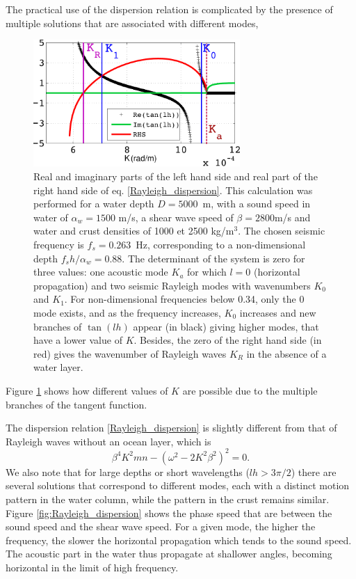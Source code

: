 The practical use of the dispersion relation is complicated by the presence of multiple solutions that are associated with different modes, 
\begin{figure}[ht]
\centerline{\includegraphics[width=0.7\textwidth]{FIGS_CH_SISMO/finding_roots_and_acoustic.pdf}}
  \caption{Real and imaginary parts of the left hand side 
  and real part of the right hand side of eq. \ref{Rayleigh_dispersion}. 
This calculation was performed for a water depth $D=5000$~m, with a sound speed in water of  $\alpha_w=1500$ m/s, a shear wave speed of  
$\beta=2800$m/s and water and crust densities of  1000 et 2500 kg/m$^3$. The chosen seismic frequency is $f_s=0.263$~Hz, 
corresponding to a non-dimensional depth $f_s h/\alpha_w=0.88$. 
The determinant of the system is zero for three values: one acoustic mode $K_a$ for which $l=0$ (horizontal propagation) and 
two seismic Rayleigh modes with wavenumbers $K_0$ and $K_1$. For non-dimensional frequencies below 0.34, only the 0 mode exists, 
and as the frequency increases, $K_0$ increases and new branches of  $\tan(lh)$ appear (in black) giving higher modes, that have a lower value 
of $K$. Besides, the zero of the right hand side (in red) gives the wavenumber of Rayleigh waves $K_R$ in the absence of a water layer.}
\label{fig:Rayleigh_roots}
\end{figure}

Figure \ref{fig:Rayleigh_roots} shows how different values of  $K$ are possible due to the multiple branches of the tangent function. 


The dispersion relation  \ref{Rayleigh_dispersion} is slightly different from that of Rayleigh waves without an ocean layer, 
which is 
\begin{equation}
\beta^4 K^2 m n  - \left (\omega^2- 2  K^2 \beta^2 \right)^2  =0.
\end{equation}
We also note that for large depths or short wavelengths  ($lh > 3 \pi / 2$) there are several solutions that 
correspond to different modes, each with a distinct motion pattern in the water column, while the pattern in the crust remains similar. 
Figure \ref{fig:Rayleigh_dispersion} shows the phase speed that are between the sound speed and the shear wave speed. 
For a given mode, the higher the frequency, the slower the horizontal propagation which tends to the sound speed. The acoustic part in the 
water thus propagate at shallower angles, becoming horizontal in the limit of high frequency. 

